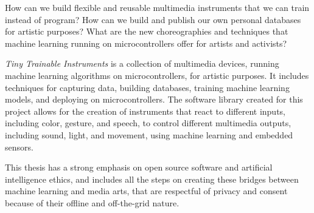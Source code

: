 % 
%
%
How can we build flexible and reusable multimedia instruments that we can train instead of program? How can we build and publish our own personal databases for artistic purposes? What are the new choreographies and techniques that machine learning running on microcontrollers offer for artists and activists?

 \emph{Tiny Trainable Instruments} is a collection of multimedia devices, running machine learning algorithms on microcontrollers, for artistic purposes. It includes techniques for capturing data, building databases, training machine learning models, and deploying on microcontrollers. The software library created for this project allows for the creation of instruments that react to different inputs, including color, gesture, and speech, to control different multimedia outputs, including sound, light, and movement, using machine learning and embedded sensors.

This thesis has a strong emphasis on open source software and artificial intelligence ethics, and includes all the steps on creating these bridges between machine learning and media arts, that are respectful of privacy and consent because of their offline and off-the-grid nature.
